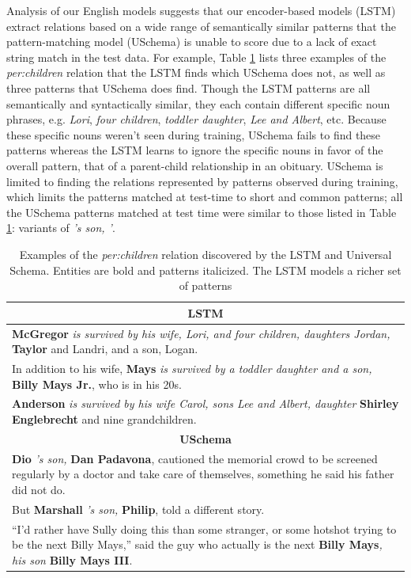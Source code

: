 Analysis of our English models suggests that our encoder-based models (LSTM) extract relations based on a wide range of semantically similar patterns that the pattern-matching model (USchema) is unable to score due to a lack of exact string match in the test data. For example, Table \ref{tab:lstm-us-similar-rels} lists three examples of the \emph{per:children} relation that the LSTM finds which USchema does not, as well as three patterns that USchema does find. Though the LSTM patterns are all semantically and syntactically similar, they each contain different specific noun phrases, e.g. \emph{Lori}, \emph{four children}, \emph{toddler daughter}, \emph{Lee and Albert}, etc. Because these specific nouns weren't seen during training, USchema fails to find these patterns whereas the LSTM learns to ignore the specific nouns in favor of the overall pattern, that of a parent-child relationship in an obituary. USchema is limited to finding the relations represented by patterns observed during training, which limits the patterns matched at test-time to short and common patterns; all the USchema patterns matched at test time were similar to those listed in Table \ref{tab:lstm-us-similar-rels}: variants of \emph{'s son, '}.


\begin{table}[h]
\begin{center}
\small
\begin{tabular}{|p{7.6cm}|}
\hline
\multicolumn{1}{|c|}{\textbf{LSTM}} \\ \hline
{\bf McGregor} \emph{is survived by his wife, Lori, and four children, daughters Jordan,} { \bf Taylor} and Landri, and a son, Logan. \\ \hline
In addition to his wife, {\bf Mays} \emph{is survived by a toddler daughter and a son,} {\bf Billy Mays Jr.}, who is in his 20s. \\ \hline
{\bf Anderson} \emph{is survived by his wife Carol, sons Lee and Albert, daughter} {\bf Shirley Englebrecht} and nine grandchildren. \\
\hline\hline
\multicolumn{1}{|c|}{\textbf{USchema}}  \\ \hline
{\bf Dio} \emph{'s son,} {\bf Dan Padavona}, cautioned the memorial crowd to be screened regularly by a doctor and take care of themselves, something he said his father did not do. \\ \hline
But {\bf Marshall} \emph{'s son,} {\bf Philip}, told a different story.  \\ \hline
``I'd rather have Sully doing this than some stranger, or some hotshot trying to
be the next Billy Mays,'' said the guy who actually is the next {\bf Billy Mays}\emph{, his son} {\bf Billy Mays III}. \\
\hline
\end{tabular}
\caption{Examples of the \emph{per:children} relation discovered by the LSTM and Universal Schema. Entities are bold and patterns italicized. The LSTM models a richer set of patterns \label{tab:lstm-us-similar-rels}}
\end{center}
\end{table}




